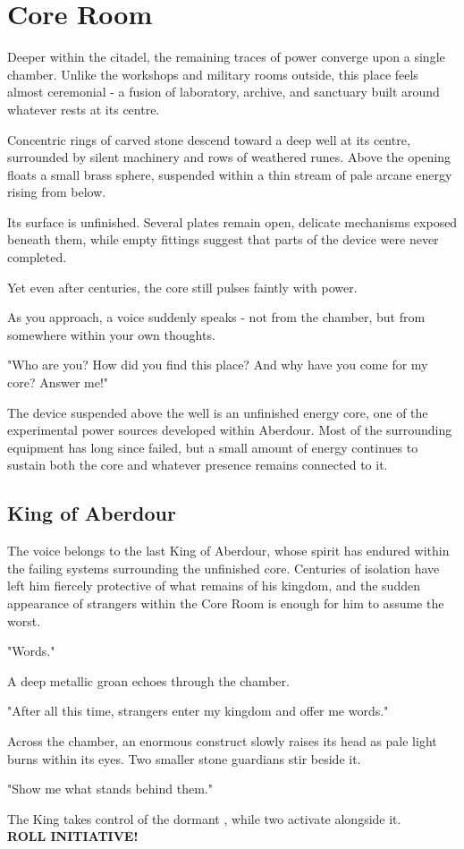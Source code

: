 \section*{ Core Room}
{\entryfont Deeper within the citadel, the remaining traces of power converge upon a single chamber. Unlike the workshops and military rooms outside, this place feels almost ceremonial - a fusion of laboratory, archive, and sanctuary built around whatever rests at its centre.}
\begin{DndReadAloud}
	Concentric rings of carved stone descend toward a deep well at its centre, surrounded by silent machinery and rows of weathered runes. Above the opening floats a small brass sphere, suspended within a thin stream of pale arcane energy rising from below.

	Its surface is unfinished. Several plates remain open, delicate mechanisms exposed beneath them, while empty fittings suggest that parts of the device were never completed.

	Yet even after centuries, the core still pulses faintly with power.

	As you approach, a voice suddenly speaks - not from the chamber, but from somewhere within your own thoughts.

	"Who are you? How did you find this place? And why have you come for my core? Answer me!"
\end{DndReadAloud}
{\noindent\entryfont The device suspended above the well is an unfinished energy core, one of the experimental power sources developed within Aberdour. Most of the surrounding equipment has long since failed, but a small amount of energy continues to sustain both the core and whatever presence remains connected to it.}
\subsection*{King of Aberdour}
{\entryfont The voice belongs to the last King of Aberdour, whose spirit has endured within the failing systems surrounding the unfinished core. Centuries of isolation have left him fiercely protective of what remains of his kingdom, and the sudden appearance of strangers within the Core Room is enough for him to assume the worst.}
\begin{DndReadAloud}
	"Words."

	A deep metallic groan echoes through the chamber.

	"After all this time, strangers enter my kingdom and offer me words."

	Across the chamber, an enormous construct slowly raises its head as pale light burns within its eyes. Two smaller stone guardians stir beside it.

	"Show me what stands behind them."
\end{DndReadAloud}
{\noindent\entryfont The King takes control of the dormant \hyperref[monster:Fellforged]{}, while two \hyperref[monster:ClockworkDefender]{} activate alongside it.\\\textbf{ROLL INITIATIVE!}}
